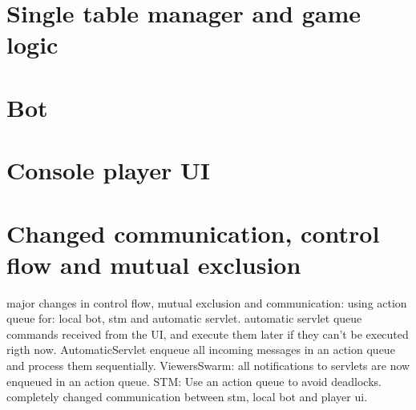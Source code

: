 \section{Single table manager and game logic}

\section{Bot}

\section{Console player UI}

\section{Changed communication, control flow and mutual exclusion}
major changes in control flow, mutual exclusion and communication:
    using action queue for: local bot, stm and automatic servlet.
    automatic servlet queue commands received from the UI, and execute them later if they can't be executed rigth now. AutomaticServlet enqueue all incoming messages in an action queue and process them sequentially.
    ViewersSwarm: all notifications to servlets are now enqueued in an action queue.
    STM: Use an action queue to avoid deadlocks. completely changed communication between stm, local bot and player ui.
